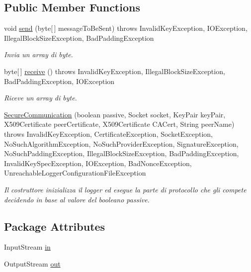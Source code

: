 \subsection*{\-Public \-Member \-Functions}
\begin{DoxyCompactItemize}
\item 
void \hyperlink{classit_1_1saccosilvestri_1_1jsp2p_1_1securecommunication_1_1_secure_communication_ab5b1a396ec73873683012ac34084e3f9}{send} (byte\mbox{[}$\,$\mbox{]} message\-To\-Be\-Sent)  throws Invalid\-Key\-Exception, 			\-I\-O\-Exception, Illegal\-Block\-Size\-Exception, Bad\-Padding\-Exception 
\begin{DoxyCompactList}\small\item\em \-Invia un array di byte. \end{DoxyCompactList}\item 
byte\mbox{[}$\,$\mbox{]} \hyperlink{classit_1_1saccosilvestri_1_1jsp2p_1_1securecommunication_1_1_secure_communication_a4bbde1476c9e908ee569b00d0e0f106c}{receive} ()  throws Invalid\-Key\-Exception, 			\-Illegal\-Block\-Size\-Exception, Bad\-Padding\-Exception, I\-O\-Exception 
\begin{DoxyCompactList}\small\item\em \-Riceve un array di byte. \end{DoxyCompactList}\item 
\hyperlink{classit_1_1saccosilvestri_1_1jsp2p_1_1securecommunication_1_1_secure_communication_a4007043b898d6773ed536da026adea5f}{\-Secure\-Communication} (boolean passive, \-Socket socket, \-Key\-Pair key\-Pair, \-X509\-Certificate peer\-Certificate, \-X509\-Certificate \-C\-A\-Cert, \-String peer\-Name)  throws Invalid\-Key\-Exception, Certificate\-Exception, Socket\-Exception, 			\-No\-Such\-Algorithm\-Exception, No\-Such\-Provider\-Exception, 			\-Signature\-Exception, No\-Such\-Padding\-Exception, 			\-Illegal\-Block\-Size\-Exception, Bad\-Padding\-Exception, 			\-Invalid\-Key\-Spec\-Exception, I\-O\-Exception, Bad\-Nonce\-Exception, Unreachable\-Logger\-Configuration\-File\-Exception 
\begin{DoxyCompactList}\small\item\em \-Il costruttore inizializza il logger ed esegue la parte di protocollo che gli compete decidendo in base al valore del booleano passive. \end{DoxyCompactList}\end{DoxyCompactItemize}
\subsection*{\-Package \-Attributes}
\begin{DoxyCompactItemize}
\item 
\-Input\-Stream \hyperlink{classit_1_1saccosilvestri_1_1jsp2p_1_1securecommunication_1_1_secure_communication_a007b240b59e1189f3994e735dae50ea5}{in}
\item 
\-Output\-Stream \hyperlink{classit_1_1saccosilvestri_1_1jsp2p_1_1securecommunication_1_1_secure_communication_a35e77cca97b78b630af1d7a4084133ad}{out}
\end{DoxyCompactItemize}


